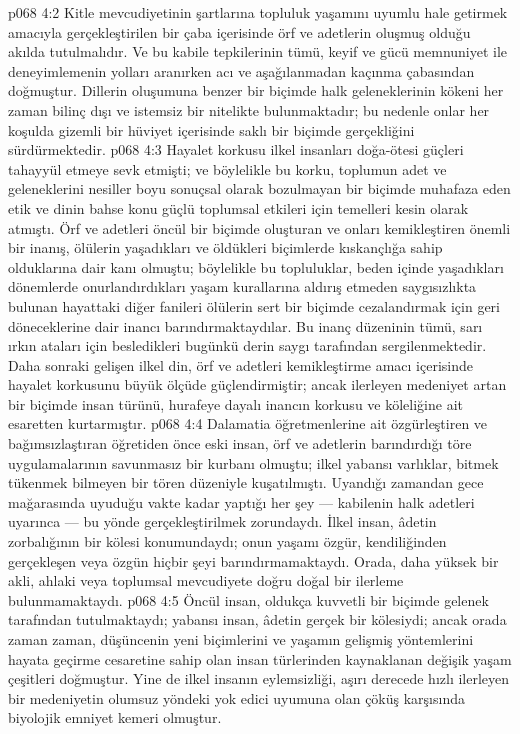 \vs p068 4:2 Kitle mevcudiyetinin şartlarına topluluk yaşamını uyumlu hale getirmek amacıyla gerçekleştirilen bir çaba içerisinde örf ve adetlerin oluşmuş olduğu akılda tutulmalıdır. Ve bu kabile tepkilerinin tümü, keyif ve gücü memnuniyet ile deneyimlemenin yolları aranırken acı ve aşağılanmadan kaçınma çabasından doğmuştur. Dillerin oluşumuna benzer bir biçimde halk geleneklerinin kökeni her zaman bilinç dışı ve istemsiz bir nitelikte bulunmaktadır; bu nedenle onlar her koşulda gizemli bir hüviyet içerisinde saklı bir biçimde gerçekliğini sürdürmektedir.
\vs p068 4:3 Hayalet korkusu ilkel insanları doğa\hyp{}ötesi güçleri tahayyül etmeye sevk etmişti; ve böylelikle bu korku, toplumun adet ve geleneklerini nesiller boyu sonuçsal olarak bozulmayan bir biçimde muhafaza eden etik ve dinin bahse konu güçlü toplumsal etkileri için temelleri kesin olarak atmıştı. Örf ve adetleri öncül bir biçimde oluşturan ve onları kemikleştiren önemli bir inanış, ölülerin yaşadıkları ve öldükleri biçimlerde kıskançlığa sahip olduklarına dair kanı olmuştu; böylelikle bu topluluklar, beden içinde yaşadıkları dönemlerde onurlandırdıkları yaşam kurallarına aldırış etmeden saygısızlıkta bulunan hayattaki diğer fanileri ölülerin sert bir biçimde cezalandırmak için geri döneceklerine dair inancı barındırmaktaydılar. Bu inanç düzeninin tümü, sarı ırkın ataları için besledikleri bugünkü derin saygı tarafından sergilenmektedir. Daha sonraki gelişen ilkel din, örf ve adetleri kemikleştirme amacı içerisinde hayalet korkusunu büyük ölçüde güçlendirmiştir; ancak ilerleyen medeniyet artan bir biçimde insan türünü, hurafeye dayalı inancın korkusu ve köleliğine ait esaretten kurtarmıştır.
\vs p068 4:4 Dalamatia öğretmenlerine ait özgürleştiren ve bağımsızlaştıran öğretiden önce eski insan, örf ve adetlerin barındırdığı töre uygulamalarının savunmasız bir kurbanı olmuştu; ilkel yabansı varlıklar, bitmek tükenmek bilmeyen bir tören düzeniyle kuşatılmıştı. Uyandığı zamandan gece mağarasında uyuduğu vakte kadar yaptığı her şey --- kabilenin halk adetleri uyarınca --- bu yönde gerçekleştirilmek zorundaydı. İlkel insan, âdetin zorbalığının bir kölesi konumundaydı; onun yaşamı özgür, kendiliğinden gerçekleşen veya özgün hiçbir şeyi barındırmamaktaydı. Orada, daha yüksek bir akli, ahlaki veya toplumsal mevcudiyete doğru doğal bir ilerleme bulunmamaktaydı.
\vs p068 4:5 Öncül insan, oldukça kuvvetli bir biçimde gelenek tarafından tutulmaktaydı; yabansı insan, âdetin gerçek bir kölesiydi; ancak orada zaman zaman, düşüncenin yeni biçimlerini ve yaşamın gelişmiş yöntemlerini hayata geçirme cesaretine sahip olan insan türlerinden kaynaklanan değişik yaşam çeşitleri doğmuştur. Yine de ilkel insanın eylemsizliği, aşırı derecede hızlı ilerleyen bir medeniyetin olumsuz yöndeki yok edici uyumuna olan çöküş karşısında biyolojik emniyet kemeri olmuştur.
